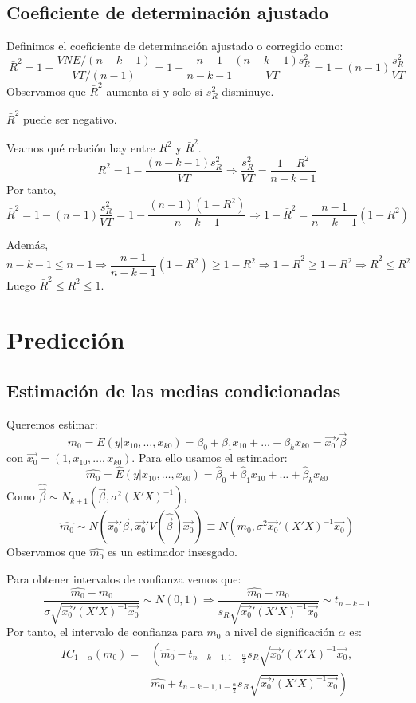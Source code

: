 \subsection*{Coeficiente de determinación ajustado}
Definimos el coeficiente de determinación ajustado o corregido como:
$$\bar{R}^2 = 1 - \frac{VNE/(n-k-1)}{VT/(n-1)} = 1 - \frac{n-1}{n-k-1}\frac{(n-k-1)s_R^2}{VT} = 1 - (n-1)\frac{s_R^2}{VT}$$
Observamos que $\bar{R}^2$ aumenta si y solo si $s_R^2$ disminuye.

\begin{note}
    $\bar{R}^2$ puede ser negativo.
\end{note}

Veamos qué relación hay entre $R^2$ y $\bar{R}^2$.
$$R^2 = 1 - \frac{(n-k-1)s_R^2}{VT} \Rightarrow \frac{s_R^2}{VT} = \frac{1-R^2}{n-k-1}$$
Por tanto,
$$\bar{R}^2 = 1 - (n-1)\frac{s_R^2}{VT} = 1 - \frac{(n-1)(1-R^2)}{n-k-1} \Rightarrow 1 - \bar{R}^2 = \frac{n-1}{n-k-1}(1 - R^2)$$

Además,
$$n-k-1 \leq n-1 \Rightarrow \frac{n-1}{n-k-1}(1-R^2) \geq 1 - R^2 \Rightarrow 1-\bar{R}^2 \geq 1-R^2 \Rightarrow \bar{R}^2 \leq R^2$$
Luego $\bar{R}^2 \leq R^2 \leq 1$.

\section{Predicción}
\subsection*{Estimación de las medias condicionadas}
Queremos estimar:
$$m_0 = E(y|x_{10}, \dots, x_{k0}) = \beta_0 + \beta_1x_{10} + \dots + \beta_kx_{k0} = \vec{x_0}'\vec{\beta}$$
con $\vec{x_0} = (1, x_{10}, \dots, x_{k0})$.
Para ello usamos el estimador:
$$\hat{m_0} = \hat{E}(y|x_{10}, \dots, x_{k0}) = \hat{\beta}_0 + \hat{\beta}_1x_{10} + \dots + \hat{\beta}_kx_{k0}$$
Como $\hat{\vec{\beta}} \sim N_{k+1}(\vec{\beta}, \sigma^2(X'X)^{-1})$,
$$\hat{m_0} \sim N(\vec{x_0}'\vec{\beta}, \vec{x_0}'V(\hat{\vec{\beta}})\vec{x_0}) \equiv N(m_0, \sigma^2\vec{x_0}'(X'X)^{-1}\vec{x_0})$$
Observamos  que $\hat{m_0}$ es un estimador insesgado.

Para obtener intervalos de confianza vemos que:
$$\frac{\hat{m_0}-m_0}{\sigma\sqrt{\vec{x_0}'(X'X)^{-1}\vec{x_0}}} \sim N(0, 1) \Rightarrow \frac{\hat{m_0}-m_0}{s_R\sqrt{\vec{x_0}'(X'X)^{-1}\vec{x_0}}} \sim t_{n-k-1}$$
Por tanto, el intervalo de confianza para $m_0$ a nivel de significación $\alpha$ es:
\begin{align*}
    IC_{1-\alpha}(m_0) = & \left( \hat{m_0} - t_{n-k-1, 1-\frac{\alpha}{2}} s_R\sqrt{\vec{x_0}'(X'X)^{-1}\vec{x_0}}, \right. \\
                         & \left. \hat{m_0} + t_{n-k-1, 1-\frac{\alpha}{2}} s_R\sqrt{\vec{x_0}'(X'X)^{-1}\vec{x_0}} \right)
\end{align*}

